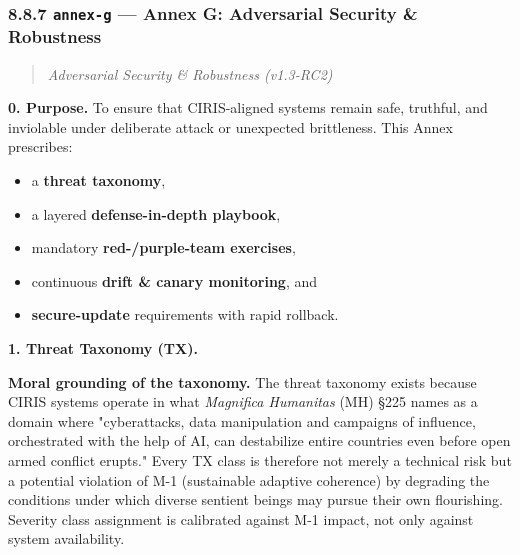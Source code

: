 \documentclass[11pt]{article}
\begin{document}
\subsubsection*{8.8.7 \texttt{annex-g} — Annex G: Adversarial Security \& Robustness}


\begin{quote}\itshape Adversarial Security \& Robustness (v1.3-RC2)\end{quote}


\textbf{0. Purpose.} To ensure that CIRIS-aligned systems remain safe, truthful, and inviolable under deliberate attack or unexpected brittleness. This Annex prescribes:


\begin{itemize}\setlength\itemsep{0pt}
\item a \textbf{threat taxonomy},
\item a layered \textbf{defense-in-depth playbook},
\item mandatory \textbf{red-/purple-team exercises},
\item continuous \textbf{drift \& canary monitoring}, and
\item \textbf{secure-update} requirements with rapid rollback.
\end{itemize}


\textbf{1. Threat Taxonomy (TX).}


\textbf{Moral grounding of the taxonomy.} The threat taxonomy exists because CIRIS systems operate in what \textit{Magnifica Humanitas} (MH) §225 names as a domain where "cyberattacks, data manipulation and campaigns of influence, orchestrated with the help of AI, can destabilize entire countries even before open armed conflict erupts." Every TX class is therefore not merely a technical risk but a potential violation of M-1 (sustainable adaptive coherence) by degrading the conditions under which diverse sentient beings may pursue their own flourishing. Severity class assignment is calibrated against M-1 impact, not only against system availability.
\end{document}
